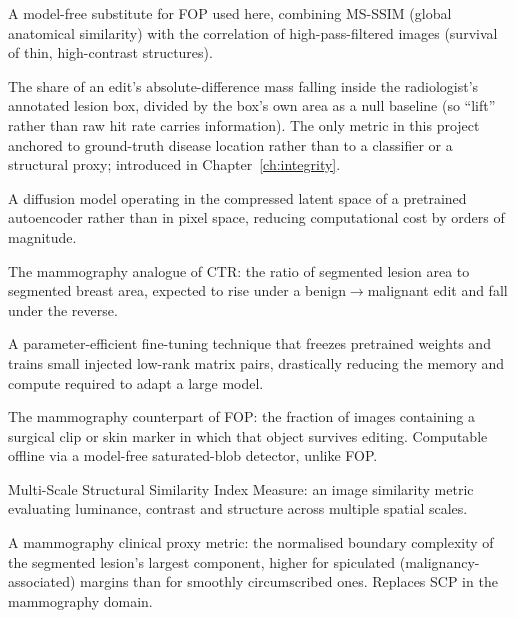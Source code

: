 \begin{description}[leftmargin=0pt,style=unboxed,itemsep=6pt]
\item[Identity Preservation (IP)] A model-free substitute for FOP used
here, combining MS-SSIM (global anatomical similarity) with the
correlation of high-pass-filtered images (survival of thin, high-contrast
structures).

\item[LHR (Lesion Hit Rate)] The share of an edit's absolute-difference
mass falling inside the radiologist's annotated lesion box, divided by the
box's own area as a null baseline (so ``lift'' rather than raw hit rate
carries information). The only metric in this project anchored to
ground-truth disease location rather than to a classifier or a structural
proxy; introduced in Chapter~\ref{ch:integrity}.

\item[Latent diffusion] A diffusion model operating in the compressed
latent space of a pretrained autoencoder rather than in pixel space,
reducing computational cost by orders of magnitude.

\item[LLR (Lesion Load Ratio)] The mammography analogue of CTR: the ratio
of segmented lesion area to segmented breast area, expected to rise under
a benign$\to$malignant edit and fall under the reverse.

\item[LoRA (Low-Rank Adaptation)] A parameter-efficient fine-tuning
technique that freezes pretrained weights and trains small injected
low-rank matrix pairs, drastically reducing the memory and compute
required to adapt a large model.

\item[MOP (Marker/clip Preservation)] The mammography counterpart of FOP:
the fraction of images containing a surgical clip or skin marker in which
that object survives editing. Computable offline via a model-free
saturated-blob detector, unlike FOP.

\item[MS-SSIM] Multi-Scale Structural Similarity Index Measure: an image
similarity metric evaluating luminance, contrast and structure across
multiple spatial scales.

\item[MSI (Margin Spiculation Index)] A mammography clinical proxy metric:
the normalised boundary complexity of the segmented lesion's largest
component, higher for spiculated (malignancy-associated) margins than for
smoothly circumscribed ones. Replaces SCP in the mammography domain.


\end{description}
